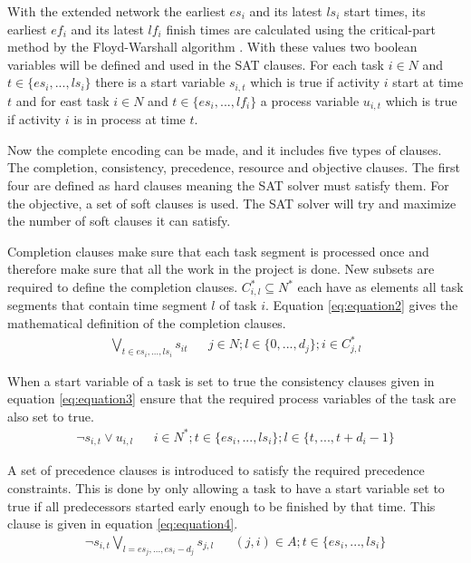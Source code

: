With the extended network the earliest \(es_i\) and its latest \(ls_i\) start times, its earliest \(ef_i\) and its latest \(lf_i\) finish times are calculated using the critical-part method by the Floyd-Warshall algorithm \cite{RN53}. With these values two boolean variables will be defined and used in the SAT clauses. For each task \(i \in N\) and \(t \in \{es_i,...,ls_i\}\) there is a start variable \(s_{i,t}\) which is true if activity \(i\) start at time \(t\) and for east task \(i \in N\) and \(t \in \{es_i,...,lf_i\}\) a process variable \(u_{i,t}\) which is true if activity \(i\) is in process at time \(t\).

Now the complete encoding can be made, and it includes five types of clauses. The completion, consistency, precedence, resource and objective clauses. The first four are defined as hard clauses meaning the SAT solver must satisfy them. For the objective, a set of soft clauses is used. The SAT solver will try and maximize the number of soft clauses it can satisfy.

Completion clauses make sure that each task segment is processed once and therefore make sure that all the work in the project is done. New subsets are required to define the completion clauses. \(C^*_{i,l} \subseteq N^*\) each have as elements all task segments that contain time segment \(l\) of task \(i\). Equation \ref{eq:equation2} gives the mathematical definition of the completion clauses.
\begin{align}\label{eq:equation2}
\bigvee_{t\in {es_i,...,ls_i}} s_{it}   &&  j\in N; l\in \{0,...,d_j\}; i\in C^*_{j,l}
\end{align}

When a start variable of a task is set to true the consistency clauses given in equation \ref{eq:equation3} ensure that the required process variables of the task are also set to true.
\begin{align}\label{eq:equation3}
\neg s_{i,t} \vee u_{i,l}   &&  i\in N^*;t\in \{es_i,...,ls_i\};l\in \{t,...,t+d_i-1\}
\end{align}

A set of precedence clauses is introduced to satisfy the required precedence constraints. This is done by only allowing a task to have a start variable set to true if all predecessors started early enough to be finished by that time. This clause is given in equation \ref{eq:equation4}.
\begin{align}\label{eq:equation4}
\neg s_{i,t} \bigvee_{l=es_j,...,es_i-d_j} s_{j,l}  &&  (j,i)\in A; t\in\{es_i,...,ls_i\}
\end{align}

